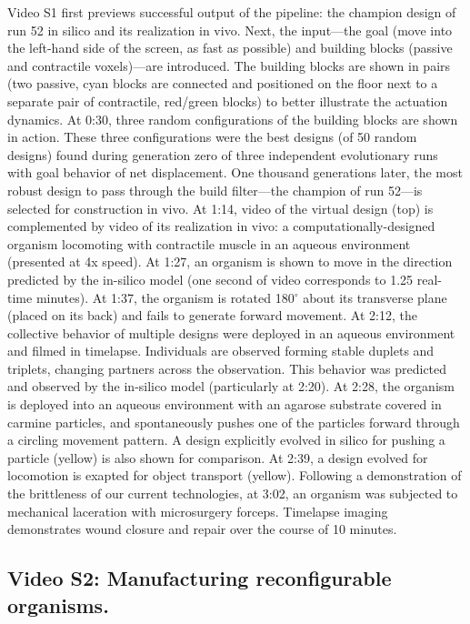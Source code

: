 Video S1 first previews successful output of the pipeline: the champion design of run 52 in silico and its realization in vivo. Next, the input---the goal (move into the left-hand side of the screen, as fast as possible) and building blocks (passive and contractile voxels)---are introduced. The building blocks are shown in pairs (two passive, cyan blocks are connected and positioned on the floor next to a separate pair of contractile, red/green blocks) to better illustrate the actuation dynamics. At 0:30, three random configurations of the building blocks are shown in action. These three configurations were the best designs (of 50 random designs) found during generation zero of three independent evolutionary runs with goal behavior of net displacement. One thousand generations later, the most robust design to pass through the build filter---the champion of run 52---is selected for construction in vivo. At 1:14, video of the virtual design (top) is complemented by video of its realization in vivo: a computationally-designed organism locomoting with contractile muscle in an aqueous environment (presented at 4x speed). At 1:27, an organism is shown to move in the direction predicted by the in-silico model (one second of video corresponds to 1.25 real-time minutes). At 1:37, the organism is rotated 180{$^{\circ}$} about its transverse plane (placed on its back) and fails to generate forward movement. At 2:12, the collective behavior of multiple designs were deployed in an aqueous environment and filmed in timelapse. Individuals are observed forming stable duplets and triplets, changing partners across the observation. This behavior was predicted and observed by the in-silico model (particularly at 2:20). At 2:28, the organism is deployed into an aqueous environment with an agarose substrate covered in carmine particles, and spontaneously pushes one of the particles forward through a circling movement pattern. A design explicitly evolved in silico for pushing a particle (yellow) is also shown for comparison. At 2:39, a design evolved for locomotion is exapted for object transport (yellow). Following a demonstration of the brittleness of our current technologies, at 3:02, an organism was subjected to mechanical laceration with microsurgery forceps. Timelapse imaging demonstrates wound closure and repair over the course of 10 minutes.


\subsection*{Video S2: Manufacturing reconfigurable organisms.}

